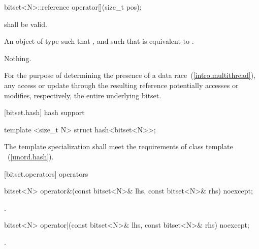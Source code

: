 \begin{itemdecl}
bitset<N>::reference operator[](size_t pos);
\end{itemdecl}

\begin{itemdescr}
\pnum
\requires
{} shall be valid.

\pnum
\returns
An object of type
such that
,
and such that
is equivalent to
.

\pnum
\throws Nothing.

\pnum
\remark For the purpose of determining the presence of a data
race~(\ref{intro.multithread}), any access or update through the resulting
reference potentially accesses or modifies, respectively, the entire
underlying bitset.
\end{itemdescr}

[bitset.hash]{ hash support}

%
\begin{itemdecl}
template <size_t N> struct hash<bitset<N>>;
\end{itemdecl}

\begin{itemdescr}
\pnum The template specialization shall meet the requirements of class template
~(\ref{unord.hash}).
\end{itemdescr}


[bitset.operators]{ operators}

%
\begin{itemdecl}
bitset<N> operator&(const bitset<N>& lhs, const bitset<N>& rhs) noexcept;
\end{itemdecl}

\begin{itemdescr}
\pnum
\returns
{}.
\end{itemdescr}

%
\begin{itemdecl}
bitset<N> operator|(const bitset<N>& lhs, const bitset<N>& rhs) noexcept;
\end{itemdecl}

\begin{itemdescr}
\pnum
\returns
{}.
\end{itemdescr}

